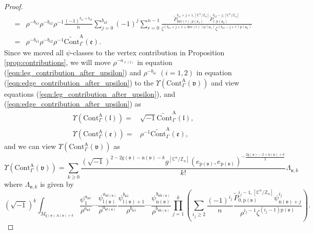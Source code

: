 \documentclass[12pt]{amsart}
\numberwithin{equation}{section}
\newcommand{\CnZn}{[\mathbb{C}^n/\mathbb{Z}_n]}
\begin{document}
\begin{proof}
\begin{equation}
\begin{aligned}
=&\rho^{-b_{\mathfrak{e}1}}\rho^{-b_{\mathfrak{e}2}}\rho^{-1}\frac{(-1)^{b_{\mathfrak{e}1}+b_{\mathfrak{e}2}}}{n} \sum_{j=0}^{b_{\mathfrak{e}2}}(-1)^{j} \sum_{r=0}^{n-1}\frac{\widetilde{P}_{\mathrm{Inv}(r),\mathrm{p}(\mathfrak{v}_1)}^{b_{\mathfrak{e}1}+j+1,\CnZn}\widetilde{P}_{r,\mathrm{p}(\mathfrak{v}_2)}^{b_{\mathfrak{e}2}-j,\CnZn}}{\zeta^{(b_{\mathfrak{e}1}+j+1+\mathrm{Inv}(r))\mathrm{p}(\mathfrak{v}_1)}\zeta^{(b_{\mathfrak{e}2}-j+r)\mathrm{p}(\mathfrak{v}_2)}}\\
=&\rho^{-b_{\mathfrak{e}1}}\rho^{-b_{\mathfrak{e}2}}\rho^{-1}\widetilde{\mathrm{Cont}}_{\Gamma}^{\mathrm{A}}(\mathfrak{e}).
\end{aligned}
\end{equation}
Since we moved all $\psi$-classes to the vertex contribution in Proposition \ref{prop:contributions}, we will move $\rho^{-{a_{\ell(\mathfrak{l})}}}$ in equation (\ref{eqn:leg_contribution_after_upsilon}) and $\rho^{-b_{\mathfrak{e}i}}$ $(i=1,2)$ in equation (\ref{eqn:edge_contribution_after_upsilon}) to the $\Upsilon\left(\mathrm{Cont}_{\Gamma}^{\mathrm{A}}(\mathfrak{v})\right)$ and view equations (\ref{eqn:leg_contribution_after_upsilon}), and (\ref{eqn:edge_contribution_after_upsilon}) as
\begin{equation}\label{eqn:Upsilon_edge_and_leg_final}
\begin{aligned}
\Upsilon\left(\mathrm{Cont}_{\Gamma}^{\mathrm{A}}(\mathfrak{l})\right)
=&\sqrt{-1}\widetilde{\mathrm{Cont}}_{\Gamma}^{\mathrm{A}}(\mathfrak{l}),\\
\Upsilon\left(\mathrm{Cont}_{\Gamma}^{\mathrm{A}}(\mathfrak{e})\right)
=&\rho^{-1}\widetilde{\mathrm{Cont}}_{\Gamma}^{\mathrm{A}}(\mathfrak{e}),
\end{aligned}
\end{equation}
and we can view $\Upsilon\left(\mathrm{Cont}_{\Gamma}^{\mathrm{A}}(\mathfrak{v})\right)$ as
\begin{equation*}
\Upsilon  \left(\mathrm{Cont}_{\Gamma}^{\mathrm{A}}(\mathfrak{v})\right)
=\sum_{k \geq 0} \frac{\left(\sqrt{-1}\right)^{2-2\mathrm{g}(\mathfrak{v})-\mathrm{n}(\mathfrak{v})-k}g^{\CnZn}({e}_{\mathrm{p}(\mathfrak{v})},{e}_{\mathrm{p}(\mathfrak{v})})^{-\frac{2\mathrm{g}(\mathfrak{v})-2+\mathrm{n}(\mathfrak{v})+k}{2}}}{k !}\Lambda_{\mathfrak{v},k}
\end{equation*}
where $\Lambda_{\mathfrak{v},k}$ is given by
\begin{equation*}
\left(\sqrt{-1}\right)^k\int_{\overline{M}_{\mathrm{g}(\mathfrak{v}),\mathrm{n}(\mathfrak{v})+k}}\frac{\psi_1^{a_{\mathfrak{v}1}}}{\rho^{a_{\mathfrak{v}1}}}\cdots  \frac{\psi_{\mathrm{l}(\mathfrak{v})}^{a_{\mathfrak{v}\mathrm{l}(\mathfrak{v})}}}{\rho^{a_{\mathfrak{v}\mathrm{l}(\mathfrak{v})}}} \frac{\psi_{\mathrm{l}(\mathfrak{v})+1}^{b_{\mathfrak{v}1}}}{\rho^{b_{\mathfrak{v}1}}} \cdots \frac{\psi_{\mathrm{n}(\mathfrak{v})}^{b_{\mathfrak{v}\mathrm{h}(\mathfrak{v})}}}{\rho^{b_{\mathfrak{v}\mathrm{h}(\mathfrak{v})}}}\prod_{j=1}^{k}\left(\sum_{i_j\geq{2}}\frac{(-1)^{i_j}}{n}\frac{\widetilde{P}_{0,\mathrm{p}(\mathfrak{v})}^{i_j-1,\CnZn}\psi_{\mathrm{n}(\mathfrak{v})+j}^{i_j}}{\rho^{i_j-1}\zeta^{{(i_j-1)}\mathrm{p}(\mathfrak{v})}}\right).

\end{equation*}
\end{proof}
\end{document}
